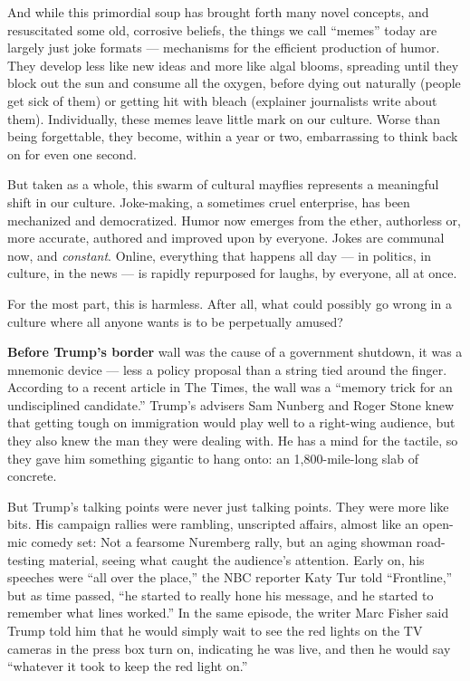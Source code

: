 And while this primordial soup has brought forth many novel concepts,
and resuscitated some old, corrosive beliefs, the things we call
``memes'' today are largely just joke formats --- mechanisms for the
efficient production of humor. They develop less like new ideas and more
like algal blooms, spreading until they block out the sun and consume
all the oxygen, before dying out naturally (people get sick of them) or
getting hit with bleach (explainer journalists write about them).
Individually, these memes leave little mark on our culture. Worse than
being forgettable, they become, within a year or two, embarrassing to
think back on for even one second.

But taken as a whole, this swarm of cultural mayflies represents a
meaningful shift in our culture. Joke-making, a sometimes cruel
enterprise, has been mechanized and democratized. Humor now emerges from
the ether, authorless or, more accurate, authored and improved upon by
everyone. Jokes are communal now, and \emph{constant}. Online,
everything that happens all day --- in politics, in culture, in the news
--- is rapidly repurposed for laughs, by everyone, all at once.

For the most part, this is harmless. After all, what could possibly go
wrong in a culture where all anyone wants is to be perpetually amused?

\textbf{Before Trump's border} wall was the cause of a government
shutdown, it was a mnemonic device --- less a policy proposal than a
string tied around the finger. According to a recent article in The
Times, the wall was a ``memory trick for an undisciplined candidate.''
Trump's advisers Sam Nunberg and Roger Stone knew that getting tough on
immigration would play well to a right-wing audience, but they also knew
the man they were dealing with. He has a mind for the tactile, so they
gave him something gigantic to hang onto: an 1,800-mile-long slab of
concrete.

But Trump's talking points were never just talking points. They were
more like bits. His campaign rallies were rambling, unscripted affairs,
almost like an open-mic comedy set: Not a fearsome Nuremberg rally, but
an aging showman road-testing material, seeing what caught the
audience's attention. Early on, his speeches were ``all over the
place,'' the NBC reporter Katy Tur told ``Frontline,'' but as time
passed, ``he started to really hone his message, and he started to
remember what lines worked.'' In the same episode, the writer Marc
Fisher said Trump told him that he would simply wait to see the red
lights on the TV cameras in the press box turn on, indicating he was
live, and then he would say ``whatever it took to keep the red light
on.''

